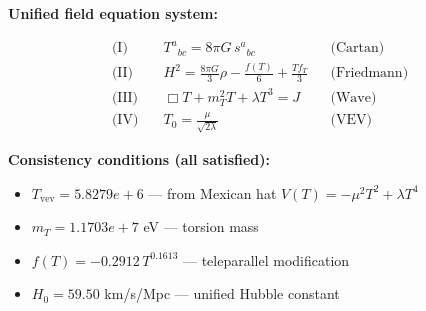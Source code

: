 
\textbf{Unified field equation system:}

\begin{align}
  \text{(I)} \quad & T^a{}_{bc} = 8\pi G \, s^a{}_{bc} && \text{(Cartan)} \\
  \text{(II)} \quad & H^2 = \frac{8\pi G}{3}\rho - \frac{f(T)}{6} + \frac{Tf_T}{3} && \text{(Friedmann)} \\
  \text{(III)} \quad & \Box T + m_T^2 T + \lambda T^3 = J && \text{(Wave)} \\
  \text{(IV)} \quad & T_0 = \frac{\mu}{\sqrt{2\lambda}} && \text{(VEV)}
\end{align}

\textbf{Consistency conditions (all satisfied):}
\begin{itemize}
  \item $T_{\text{vev}} = 5.8279e+6$ — from Mexican hat $V(T) = -\mu^2 T^2 + \lambda T^4$
  \item $m_T = 1.1703e+7$ eV — torsion mass
  \item $f(T) = -0.2912 \, T^{0.1613}$ — teleparallel modification
  \item $H_0 = 59.50$ km/s/Mpc — unified Hubble constant
\end{itemize}